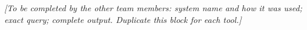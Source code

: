 
\noindent\textit{[To be completed by the other team members: system name and how it was used; exact query; complete output. Duplicate this block for each tool.]}
